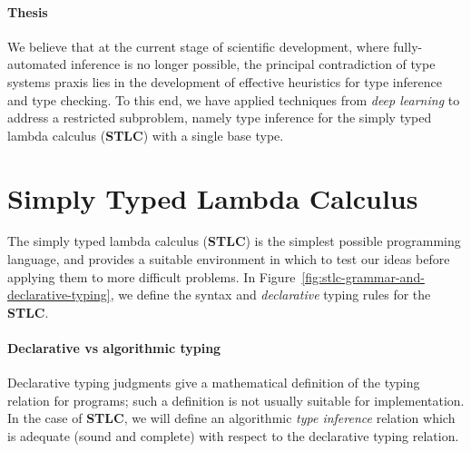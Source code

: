 \documentclass[twocolumn,9pt]{article}
\theoremstyle{definition}
\theoremstyle{remark}
\numberwithin{equation}{section}
\newcommand\STLC{{\sffamily\bfseries{}STLC}}
\begin{document}
\paragraph{Thesis}
We believe that at the current stage of scientific development, where
fully-automated inference is no longer possible, the principal
contradiction of type systems praxis lies in the development of
effective heuristics for type inference and type checking. To this
end, we have applied techniques from \emph{deep learning} to address a
restricted subproblem, namely type inference for the simply typed
lambda calculus (\STLC{}) with a single base type.

\section{Simply Typed Lambda Calculus}
The simply typed lambda calculus (\STLC{}) is the simplest possible
programming language, and provides a suitable environment in which to
test our ideas before applying them to more difficult problems. In
Figure~\ref{fig:stlc-grammar-and-declarative-typing}, we define the
syntax and \emph{declarative} typing rules for the \STLC{}.

\paragraph{Declarative vs algorithmic typing}
Declarative typing judgments give a mathematical definition of the
typing relation for programs; such a definition is not usually
suitable for implementation. In the case of \STLC{}, we will define an
algorithmic \emph{type inference} relation which is adequate (sound
and complete) with respect to the declarative typing relation.
\end{document}
